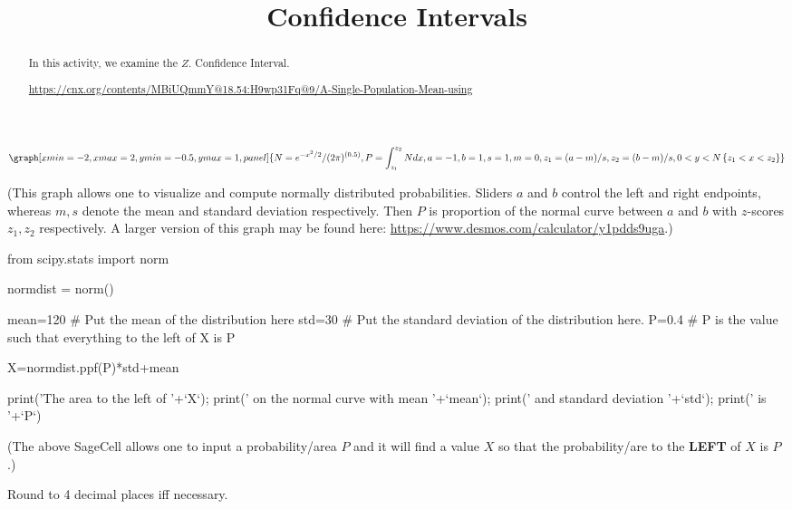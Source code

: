 \documentclass{ximera}
\title{Confidence Intervals}
\begin{document}
      
\begin{abstract}
      
In this activity, we examine the $Z$. Confidence Interval.

\url{https://cnx.org/contents/MBiUQmmY@18.54:H9wp31Fq@9/A-Single-Population-Mean-using}

      
\end{abstract}
      
\maketitle
 

\begin{onlineOnly}
$$\graph[xmin=-2,xmax=2,ymin=-0.5,ymax=1, panel]{N=e^{-x^2/2}/(2\pi)^{(0.5)}, P=\int_{z_1}^{z_2} N dx, a=-1, b=1, s=1, m=0, z_1=(a-m)/s, z_2=(b-m)/s, 0<y<N\left\{z_1<x<z_2\right\}}$$
\end{onlineOnly}
(This graph allows one to visualize and compute normally distributed probabilities.  Sliders $a$ and $b$ control the left and right endpoints, whereas $m, s$ denote the mean and standard deviation respectively.  Then $P$ is proportion of the normal curve between $a$ and $b$ with $z$-scores $z_1, z_2$ respectively.  A larger version of this graph may be found here: \url{https://www.desmos.com/calculator/y1pdds9uga}.)


\begin{sageCell}
from scipy.stats import norm

normdist = norm()

mean=120 # Put the mean of the distribution here
std=30  # Put the standard deviation of the distribution here.
P=0.4  # P is the value such that everything to the left of X is P

X=normdist.ppf(P)*std+mean

print('The area to the left of '+`X`); print(' on the normal curve with mean '+`mean`); print(' and standard deviation '+`std`); print(' is  '+`P`)
\end{sageCell}
(The above SageCell allows one to input a probability/area $P$ and it will find a value $X$ so that the probability/are to the \textbf{LEFT} of $X$ is $P$.)


Round to 4 decimal places iff necessary.
\end{document}
